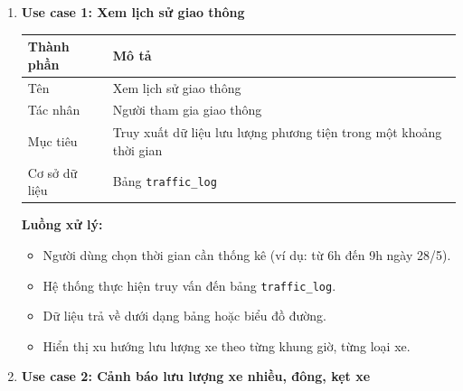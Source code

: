 \begin{enumerate}
    \item \textbf{Use case 1: Xem lịch sử giao thông}
    
    \begin{table}[H]
        \centering
        \begin{tabular}{|p{4cm}|p{10cm}|}
            \hline
            \textbf{Thành phần} & \textbf{Mô tả} \\ \hline
            Tên & Xem lịch sử giao thông \\ \hline
            Tác nhân & Người tham gia giao thông \\ \hline
            Mục tiêu & Truy xuất dữ liệu lưu lượng phương tiện trong một khoảng thời gian \\ \hline
            Cơ sở dữ liệu & Bảng \texttt{traffic\_log} \\ \hline
        \end{tabular}
    \end{table}
    
    \textbf{Luồng xử lý:}
    \begin{itemize}
        \item Người dùng chọn thời gian cần thống kê (ví dụ: từ 6h đến 9h ngày 28/5).
        \item Hệ thống thực hiện truy vấn đến bảng \texttt{traffic\_log}.
        \item Dữ liệu trả về dưới dạng bảng hoặc biểu đồ đường.
        \item Hiển thị xu hướng lưu lượng xe theo từng khung giờ, từng loại xe.
    \end{itemize}
    
    \item \textbf{Use case 2: Cảnh báo lưu lượng xe nhiều, đông, kẹt xe}
    

\end{enumerate}
